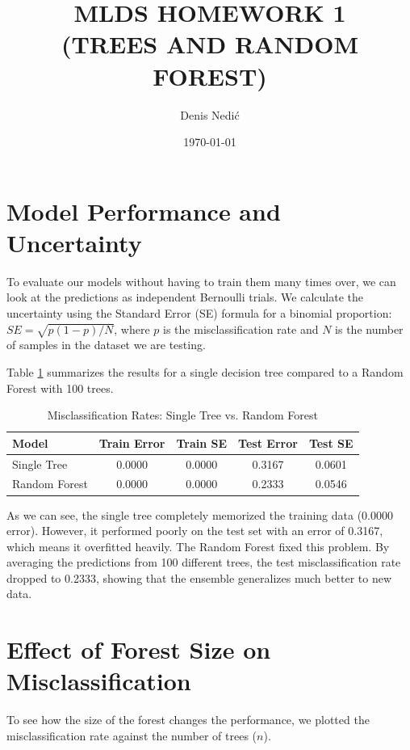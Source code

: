 \documentclass[11pt, a4paper]{article}
\title{{\bf MLDS HOMEWORK 1} \\
(TREES AND RANDOM FOREST)}
\author{Denis Nedić}
\date{\today}
\begin{document}
\maketitle
\vspace{-1cm} %

\section{Model Performance and Uncertainty}
To evaluate our models without having to train them many times over, we can look at the predictions as independent Bernoulli trials. We calculate the uncertainty using the Standard Error (SE) formula for a binomial proportion: $SE = \sqrt{p(1 - p)/N}$, where $p$ is the misclassification rate and $N$ is the number of samples in the dataset we are testing.

Table \ref{tab:results} summarizes the results for a single decision tree compared to a Random Forest with 100 trees.

\begin{table}[H]
    \centering
    \caption{Misclassification Rates: Single Tree vs. Random Forest}
    \label{tab:results}
    \begin{tabular}{l c c c c}
        \hline
        \textbf{Model} & \textbf{Train Error} & \textbf{Train SE} & \textbf{Test Error} & \textbf{Test SE} \\
        \hline
        Single Tree & 0.0000 & 0.0000 & 0.3167 & 0.0601 \\
        Random Forest & 0.0000 & 0.0000 & 0.2333 & 0.0546 \\
        \hline
    \end{tabular}
\end{table}

As we can see, the single tree completely memorized the training data (0.0000 error). However, it performed poorly on the test set with an error of 0.3167, which means it overfitted heavily. The Random Forest fixed this problem. By averaging the predictions from 100 different trees, the test misclassification rate dropped to 0.2333, showing that the ensemble generalizes much better to new data.
\vspace{-2mm}
\section{Effect of Forest Size on Misclassification}
To see how the size of the forest changes the performance, we plotted the misclassification rate against the number of trees ($n$).
\end{document}
